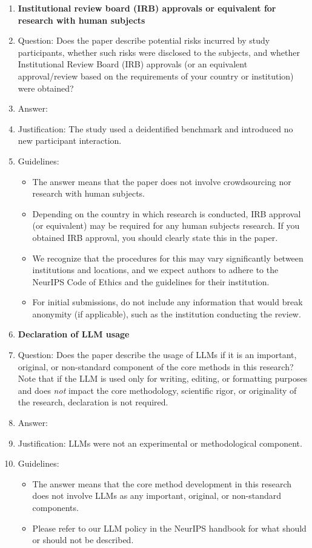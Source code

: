 \documentclass{article}
\begin{document}
\begin{enumerate}
\item {\bf Institutional review board (IRB) approvals or equivalent for research with human subjects}
    \item[] Question: Does the paper describe potential risks incurred by study participants, whether such risks were disclosed to the subjects, and whether Institutional Review Board (IRB) approvals (or an equivalent approval/review based on the requirements of your country or institution) were obtained?
    \item[] Answer: \answerNA{}
    \item[] Justification: The study used a deidentified benchmark and introduced no new participant interaction.
    \item[] Guidelines:
    \begin{itemize}
        \item The answer \answerNA{} means that the paper does not involve crowdsourcing nor research with human subjects.
        \item Depending on the country in which research is conducted, IRB approval (or equivalent) may be required for any human subjects research. If you obtained IRB approval, you should clearly state this in the paper. 
        \item We recognize that the procedures for this may vary significantly between institutions and locations, and we expect authors to adhere to the NeurIPS Code of Ethics and the guidelines for their institution. 
        \item For initial submissions, do not include any information that would break anonymity (if applicable), such as the institution conducting the review.
    \end{itemize}

\item {\bf Declaration of LLM usage}
    \item[] Question: Does the paper describe the usage of LLMs if it is an important, original, or non-standard component of the core methods in this research? Note that if the LLM is used only for writing, editing, or formatting purposes and does \emph{not} impact the core methodology, scientific rigor, or originality of the research, declaration is not required.
    \item[] Answer: \answerNA{}
    \item[] Justification: LLMs were not an experimental or methodological component.
    \item[] Guidelines:
    \begin{itemize}
        \item The answer \answerNA{} means that the core method development in this research does not involve LLMs as any important, original, or non-standard components.
        \item Please refer to our LLM policy in the NeurIPS handbook for what should or should not be described.
    \end{itemize}

\end{enumerate}
\end{document}

